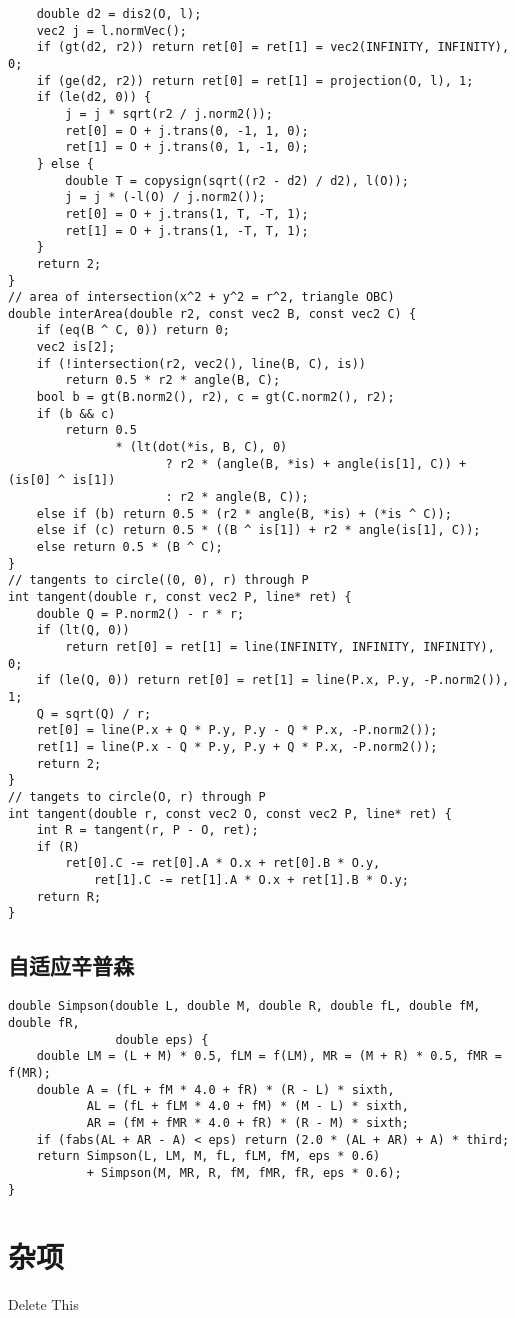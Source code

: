 \documentclass[twoside]{article}
\begin{document}
\begin{lstlisting}
	double d2 = dis2(O, l);
	vec2 j = l.normVec();
	if (gt(d2, r2)) return ret[0] = ret[1] = vec2(INFINITY, INFINITY), 0;
	if (ge(d2, r2)) return ret[0] = ret[1] = projection(O, l), 1;
	if (le(d2, 0)) {
		j = j * sqrt(r2 / j.norm2());
		ret[0] = O + j.trans(0, -1, 1, 0);
		ret[1] = O + j.trans(0, 1, -1, 0);
	} else {
		double T = copysign(sqrt((r2 - d2) / d2), l(O));
		j = j * (-l(O) / j.norm2());
		ret[0] = O + j.trans(1, T, -T, 1);
		ret[1] = O + j.trans(1, -T, T, 1);
	}
	return 2;
}
// area of intersection(x^2 + y^2 = r^2, triangle OBC)
double interArea(double r2, const vec2 B, const vec2 C) {
	if (eq(B ^ C, 0)) return 0;
	vec2 is[2];
	if (!intersection(r2, vec2(), line(B, C), is))
		return 0.5 * r2 * angle(B, C);
	bool b = gt(B.norm2(), r2), c = gt(C.norm2(), r2);
	if (b && c)
		return 0.5
		       * (lt(dot(*is, B, C), 0)
		              ? r2 * (angle(B, *is) + angle(is[1], C)) + (is[0] ^ is[1])
		              : r2 * angle(B, C));
	else if (b) return 0.5 * (r2 * angle(B, *is) + (*is ^ C));
	else if (c) return 0.5 * ((B ^ is[1]) + r2 * angle(is[1], C));
	else return 0.5 * (B ^ C);
}
// tangents to circle((0, 0), r) through P
int tangent(double r, const vec2 P, line* ret) {
	double Q = P.norm2() - r * r;
	if (lt(Q, 0))
		return ret[0] = ret[1] = line(INFINITY, INFINITY, INFINITY), 0;
	if (le(Q, 0)) return ret[0] = ret[1] = line(P.x, P.y, -P.norm2()), 1;
	Q = sqrt(Q) / r;
	ret[0] = line(P.x + Q * P.y, P.y - Q * P.x, -P.norm2());
	ret[1] = line(P.x - Q * P.y, P.y + Q * P.x, -P.norm2());
	return 2;
}
// tangets to circle(O, r) through P
int tangent(double r, const vec2 O, const vec2 P, line* ret) {
	int R = tangent(r, P - O, ret);
	if (R)
		ret[0].C -= ret[0].A * O.x + ret[0].B * O.y,
		    ret[1].C -= ret[1].A * O.x + ret[1].B * O.y;
	return R;
}\end{lstlisting}
\subsection{自适应辛普森}
\begin{lstlisting}
double Simpson(double L, double M, double R, double fL, double fM, double fR,
               double eps) {
	double LM = (L + M) * 0.5, fLM = f(LM), MR = (M + R) * 0.5, fMR = f(MR);
	double A = (fL + fM * 4.0 + fR) * (R - L) * sixth,
	       AL = (fL + fLM * 4.0 + fM) * (M - L) * sixth,
	       AR = (fM + fMR * 4.0 + fR) * (R - M) * sixth;
	if (fabs(AL + AR - A) < eps) return (2.0 * (AL + AR) + A) * third;
	return Simpson(L, LM, M, fL, fLM, fM, eps * 0.6)
	       + Simpson(M, MR, R, fM, fMR, fR, eps * 0.6);
}\end{lstlisting}
\clearpage\section{杂项}
Delete This
\begin{lstlisting}
\end{lstlisting}
\end{document}
